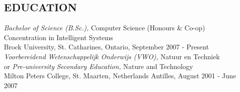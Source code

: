 \documentclass[margin]{res}
\begin{document}
\begin{resume}




\section{EDUCATION}
  {\sl Bachelor of Science (B.Sc.),} Computer Science (Honours \& Co-op) \\
  Concentration in Intelligent Systems \\
  Brock University, St. Catharines, Ontario, 
  \hfill September 2007 - Present \\
                
  {\sl Voorbereidend Wetenschappelijk Onderwijs (VWO),} Natuur en Techniek \\
  or {\sl Pre-university Secondary Education,} Nature and Technology \\
  Milton Peters College, St. Maarten, Netherlands Antilles, 
  \hfill August 2001 - June 2007 \\


\end{resume}
\end{document}
